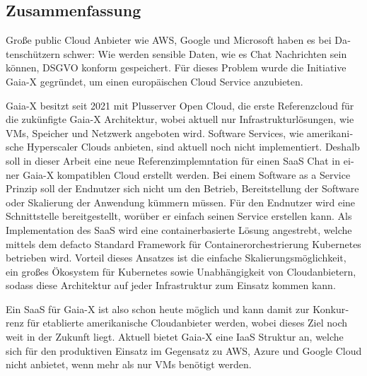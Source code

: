 \begin{otherlanguage}{ngerman}
	\chapter*{Zusammenfassung}

	Große public Cloud Anbieter wie AWS, Google und Microsoft haben es bei Datenschützern schwer:
	Wie werden sensible Daten, wie es Chat Nachrichten sein können, DSGVO konform gespeichert.
	Für dieses Problem wurde die Initiative Gaia-X gegründet, um einen europäischen Cloud Service anzubieten.


	Gaia-X besitzt seit 2021 mit Plusserver Open Cloud, die erste Referenzcloud für die zukünfigte Gaia-X Architektur,
	wobei aktuell nur Infrastrukturlösungen, wie \acp{VM}, Speicher und Netzwerk angeboten wird. 
	Software Services, wie amerikanische Hyperscaler Clouds anbieten, sind aktuell noch nicht implementiert.
	Deshalb soll in dieser Arbeit eine neue Referenzimplemntation für einen \ac{SaaS} Chat in einer Gaia-X kompatiblen Cloud erstellt werden.
	Bei einem Software as a Service Prinzip soll der Endnutzer sich nicht um den Betrieb, Bereitstellung der Software
	oder Skalierung der Anwendung kümmern müssen. Für den Endnutzer wird eine Schnittstelle bereitgestellt, worüber er einfach seinen Service erstellen kann.
	Als Implementation des \ac{SaaS} wird eine containerbasierte Lösung angestrebt, welche mittels dem defacto Standard Framework für 
	Containerorchestrierung Kubernetes betrieben wird. Vorteil dieses Ansatzes ist die einfache Skalierungsmöglichkeit, ein großes Ökosystem für Kubernetes
	sowie Unabhängigkeit von Cloudanbietern, sodass diese Architektur auf jeder Infrastruktur zum Einsatz kommen kann.

	Ein \ac{SaaS} für Gaia-X ist also schon heute möglich und kann damit zur Konkurrenz für etablierte amerikanische Cloudanbieter werden,
	wobei dieses Ziel noch weit in der Zukunft liegt. Aktuell bietet Gaia-X eine \ac{IaaS} Struktur an, welche sich für den produktiven Einsatz
	im Gegensatz zu AWS, Azure und Google Cloud nicht anbietet, wenn mehr als nur \acp{VM} benötigt werden.
\end{otherlanguage}
